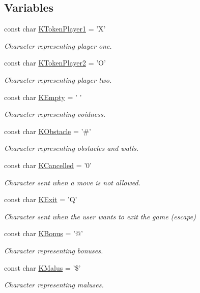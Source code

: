 \subsection*{Variables}
\begin{DoxyCompactItemize}
\item 
const char \hyperlink{namespace_chase_game_a8452e2d6de618e4ca7a9f76b082b52a4}{K\-Token\-Player1} = 'X'
\begin{DoxyCompactList}\small\item\em Character representing player one. \end{DoxyCompactList}\item 
const char \hyperlink{namespace_chase_game_ae27343407c21a8d6e3cf26b736bd5527}{K\-Token\-Player2} = 'O'
\begin{DoxyCompactList}\small\item\em Character representing player two. \end{DoxyCompactList}\item 
const char \hyperlink{namespace_chase_game_aa036d4de40188ba2e1aa36ab6cfaf1da}{K\-Empty} = ' '
\begin{DoxyCompactList}\small\item\em Character representing voidness. \end{DoxyCompactList}\item 
const char \hyperlink{namespace_chase_game_ad86181b2050b912dab9d69d2f0bea76e}{K\-Obstacle} = '\#'
\begin{DoxyCompactList}\small\item\em Character representing obstacles and walls. \end{DoxyCompactList}\item 
const char \hyperlink{namespace_chase_game_a12d6411bb9a72150acba6060bb1587e1}{K\-Cancelled} = '0'
\begin{DoxyCompactList}\small\item\em Character sent when a move is not allowed. \end{DoxyCompactList}\item 
const char \hyperlink{namespace_chase_game_a1f787138e31b0a9dc2fbaad3547b246a}{K\-Exit} = 'Q'
\begin{DoxyCompactList}\small\item\em Character sent when the user wants to exit the game (escape) \end{DoxyCompactList}\item 
const char \hyperlink{namespace_chase_game_a202a236c81f69bdfc031abd6654b8132}{K\-Bonus} = '@'
\begin{DoxyCompactList}\small\item\em Character representing bonuses. \end{DoxyCompactList}\item 
const char \hyperlink{namespace_chase_game_ad3c85aebf9881b576634247b5db00b96}{K\-Malus} = '\$'
\begin{DoxyCompactList}\small\item\em Character representing maluses. \end{DoxyCompactList}\end{DoxyCompactItemize}


